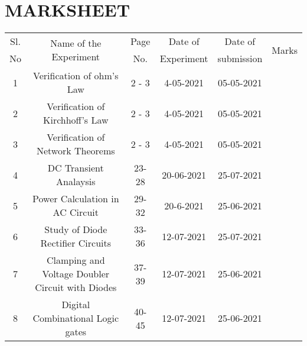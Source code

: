 \section*{\centering MARKSHEET}

\begin{table}[h]
	\renewcommand{\arraystretch}{1.3}
	\label{table_switching_logic}
	\centering
	\begin{tabular}{|c||c|c|c|c|c|}
		\hline
		Sl. & \multirow{ 2}{*}{Name of the Experiment}         & Page  & Date of    & Date of    & \multirow{ 2}{*}{Marks} \\
		No  &                                                  & No.   & Experiment & submission &                         \\
		\hline
		\hline
		1   & Verification of ohm's Law                        & 2 - 3 & 4-05-2021  & 05-05-2021 &                         \\
		\hline
		2   & Verification of Kirchhoff’s Law                  & 2 - 3 & 4-05-2021  & 05-05-2021 &                         \\
		\hline
		3   & Verification of Network Theorems                 & 2 - 3 & 4-05-2021  & 05-05-2021 &                         \\
		\hline
		4   & DC Transient Analaysis                           & 23-28 & 20-06-2021 & 25-07-2021 &                         \\
		\hline
		5   & Power Calculation in AC Circuit                  & 29-32 & 20-6-2021  & 25-06-2021 &                         \\
		\hline
		6   & Study of Diode Rectifier Circuits                & 33-36 & 12-07-2021 & 25-07-2021 &                         \\
		\hline
		7   & Clamping and Voltage Doubler Circuit with Diodes & 37-39 & 12-07-2021 & 25-06-2021 &                         \\
		\hline
		8   & Digital Combinational Logic gates                & 40-45 & 12-07-2021 & 25-06-2021 &                         \\
		\hline
	\end{tabular}
\end{table}

\pagebreak